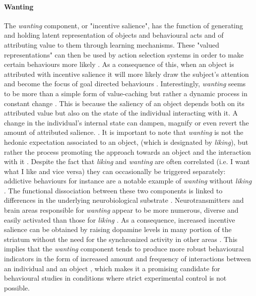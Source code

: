 \paragraph{Wanting}
\label{wanting}
The \emph{wanting} component, or "incentive salience", has the function of generating and holding latent representation of objects and behavioural acts and of attributing value to them through learning mechanisms. These "valued representations" can then be used by action selection systems in order to make certain behaviours more likely \cite{ikemoto1996dissociations,berridge1998role,mcclure2003computational,berridge2004motivation}. As a consequence of this, when an object is attributed with incentive salience it will more likely draw the subject's attention and become the focus of goal directed behaviours \cite{berridge2004motivation}. Interestingly, \emph{wanting} seems to be more than a simple form of value-caching but rather a dynamic process in constant change \cite{robinson1993neural,zhang2009neural,tindell2009dynamic,berridge2012prediction}. This is because the saliency of an object depends both on its attributed value but also on the state of the individual interacting with it. A change in the individual's internal state can dampen, magnify or even revert the amount of attributed salience. \cite{robinson1993neural,zhang2009neural,tindell2009dynamic,berridge2012prediction}. It is important to note that \emph{wanting} is not the hedonic expectation associated to an object, (which is designated by \emph{liking}), but rather the process promoting the approach towards an object and the interaction with it \cite{berridge2009dissecting,robinson2015roles}. Despite the fact that \emph{liking} and \emph{wanting} are often correlated (i.e. I want what I like and vice versa) they can occasionally be triggered separately: addictive behaviours for instance are a notable example of \emph{wanting} without \emph{liking} \cite{robinson1993neural}. The functional dissociation between these two components is linked to differences in the underlying neurobiological substrate \cite{berridge2009dissecting,smith2011disentangling}. Neurotransmitters and brain areas responsible for \emph{wanting} appear to be more numerous, diverse and easily activated than those for \emph{liking} \cite{berridge2009dissecting,robinson2015roles}. As a consequence, increased incentive salience can be obtained by raising dopamine levels in many portion of the striatum without the need for the synchronized activity in other areas \cite{berridge2009dissecting,smith2011disentangling,meyer2015motivational}. This implies that the \emph{wanting} component tends to produce more robust behavioural indicators in the form of increased amount and frequency of interactions between an individual and an object \cite{berridge1998role}, which makes it a promising candidate for behavioural studies in conditions where strict experimental control is not possible.


